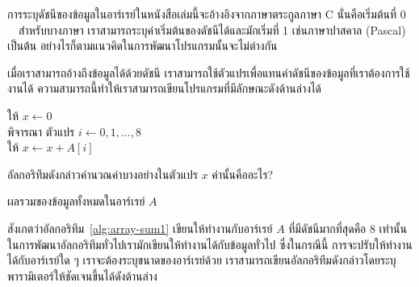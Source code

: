 การ{\wbr}ระบุ{\wbr}ดัชนี{\wbr}ของ{\wbr}ข้อมูล{\wbr}ใน{\wbr}อาร์เรย์{\wbr}ใน{\wbr}หนังสือ{\wbr}เล่ม{\wbr}นี้{\wbr}จะ{\wbr}อ้างอิง{\wbr}จาก{\wbr}ภาษา{\wbr}ตระกูล{\wbr}ภาษา C
นั่น{\wbr}คือ{\wbr}เริ่มต้น{\wbr}ที่ 0 \ \ สำหรับ{\wbr}บาง{\wbr}ภาษา เรา{\wbr}สามารถ{\wbr}ระบุ{\wbr}ค่า{\wbr}เริ่มต้น{\wbr}ของ{\wbr}ดัชนี{\wbr}ได้{\wbr}และ{\wbr}มัก{\wbr}เริ่ม{\wbr}ที่ 1
เช่น{\wbr}ภาษา{\wbr}ปา{\wbr}ส{\wbr}คา{\wbr}ล (Pascal) เป็นต้น{\wbr}
อย่างไรก็ตาม{\wbr}แนว{\wbr}คิด{\wbr}ใน{\wbr}การ{\wbr}พัฒนา{\wbr}โปรแกรม{\wbr}นั้น{\wbr}จะ{\wbr}ไม่{\wbr}ต่าง{\wbr}กัน{\wbr}

เมื่อ{\wbr}เรา{\wbr}สามารถ{\wbr}อ้าง{\wbr}ถึง{\wbr}ข้อมูล{\wbr}ได้{\wbr}ด้วย{\wbr}ดัชนี{\wbr}
เรา{\wbr}สามารถ{\wbr}ใช้{\wbr}ตัวแปร{\wbr}เพื่อ{\wbr}แทน{\wbr}ค่า{\wbr}ดัชนี{\wbr}ของ{\wbr}ข้อมูล{\wbr}ที่{\wbr}เรา{\wbr}ต้องการ{\wbr}ใช้{\wbr}งาน{\wbr}ได้{\wbr}
ความ{\wbr}สามารถ{\wbr}นี้{\wbr}ทำ{\wbr}ให้{\wbr}เรา{\wbr}สามารถ{\wbr}เขียน{\wbr}โปรแกรม{\wbr}ที่{\wbr}มี{\wbr}ลักษณะ{\wbr}ดัง{\wbr}ด้าน{\wbr}ล่าง{\wbr}ได้{\wbr}

\begin{algt}
\label{alg:array-sum1}
\noindent \hspace*{0.2in} ให้ $x\leftarrow 0$\\
\hspace*{0.2in} พิจารณา ตัวแปร $i\leftarrow 0,1,\ldots,8$\\
\hspace*{0.2in}\hspace*{0.2in} ให้ $x \leftarrow x + A[i]$
\end{algt}

\begin{quiz}{}
อัล{\wbr}กอ{\wbr}ริ{\wbr}ทึม{\wbr}ดังกล่าว{\wbr}คำนวณ{\wbr}ค่า{\wbr}บาง{\wbr}อย่าง{\wbr}ใน{\wbr}ตัวแปร $x$ ค่า{\wbr}นั้น{\wbr}คือ{\wbr}อะไร?
\end{quiz}
\begin{quizans}
ผลรวม{\wbr}ของ{\wbr}ข้อมูล{\wbr}ทั้งหมด{\wbr}ใน{\wbr}อาร์เรย์ $A$
\end{quizans}

สังเกต{\wbr}ว่า{\wbr}อัล{\wbr}กอ{\wbr}ริ{\wbr}ทึม~\ref{alg:array-sum1} เขียน{\wbr}ให้{\wbr}ทำงาน{\wbr}กับ{\wbr}อาร์เรย์ $A$
ที่{\wbr}มี{\wbr}ดัชนี{\wbr}มาก{\wbr}ที่สุด{\wbr}คือ 8 เท่านั้น ใน{\wbr}การ{\wbr}พัฒนา{\wbr}อัล{\wbr}กอ{\wbr}ริ{\wbr}ทึม{\wbr}ทั่วไป{\wbr}เรา{\wbr}มัก{\wbr}เขียน{\wbr}ให้{\wbr}ทำงาน{\wbr}ได้{\wbr}กับ{\wbr}ข้อมูล{\wbr}ทั่วไป{\wbr}
ซึ่ง{\wbr}ใน{\wbr}กรณี{\wbr}นี้ การ{\wbr}จะ{\wbr}ปรับ{\wbr}ให้{\wbr}ทำงาน{\wbr}ได้{\wbr}กับ{\wbr}อาร์เรย์{\wbr}ใด ๆ เรา{\wbr}จะ{\wbr}ต้อง{\wbr}ระบุ{\wbr}ขนาด{\wbr}ของ{\wbr}อาร์เรย์{\wbr}ด้วย{\wbr}
เรา{\wbr}สามารถ{\wbr}เขียน{\wbr}อัล{\wbr}กอ{\wbr}ริ{\wbr}ทึม{\wbr}ดังกล่าว{\wbr}โดย{\wbr}ระบุ{\wbr}พารามิเตอร์{\wbr}ให้{\wbr}ชัดเจน{\wbr}ขึ้น{\wbr}ได้{\wbr}ดัง{\wbr}ด้าน{\wbr}ล่าง{\wbr}


